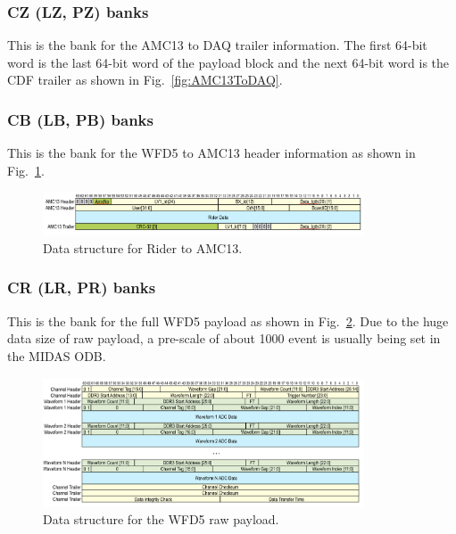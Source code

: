 \subsubsection*{CZ (LZ, PZ) banks}

This is the bank for the AMC13 to DAQ trailer information.
The first 64-bit word is the last 64-bit word of the payload block and the next 64-bit word is the CDF trailer as shown in Fig.~\ref{fig:AMC13ToDAQ}.


\subsubsection*{CB (LB, PB) banks}

This is the bank for the WFD5 to AMC13 header information as shown in Fig.~\ref{fig:RiderToAMC13}.

\begin{figure}[htbp]
\centering
\includegraphics[width=0.85\textwidth]{pics/RiderToAMC13.pdf} 
\caption{Data structure for Rider to AMC13.}\label{fig:RiderToAMC13}
\end{figure}

\subsubsection*{CR (LR, PR) banks}

This is the bank for the full WFD5 payload as shown in Fig.~\ref{fig:RiderData}. Due to the huge data size of raw payload, a pre-scale of about 1000 event is usually being set in the MIDAS ODB.

\begin{figure}[htbp]
\centering
\includegraphics[width=0.85\textwidth]{pics/RiderData.pdf} 
\caption{Data structure for the WFD5 raw payload.}\label{fig:RiderData}
\end{figure}


